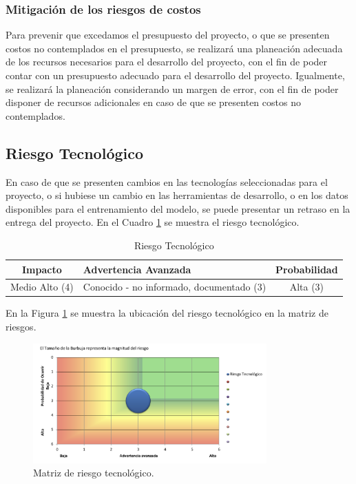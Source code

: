\subsubsection{Mitigación de los riesgos de costos}

Para prevenir que excedamos el presupuesto del proyecto, o que se presenten
costos no contemplados en el presupuesto, se realizará una planeación adecuada
de los recursos necesarios para el desarrollo del proyecto, con el fin de poder
contar con un presupuesto adecuado para el desarrollo del proyecto. Igualmente,
se realizará la planeación considerando un margen de error, con el fin de poder
disponer de recursos adicionales en caso de que se presenten costos no contemplados.

\subsection{Riesgo Tecnológico}

En caso de que se presenten cambios en las tecnologías seleccionadas para el
proyecto, o si hubiese un cambio en las herramientas de desarrollo, o en los
datos disponibles para el entrenamiento del modelo, se puede presentar un
retraso en la entrega del proyecto. En el Cuadro \ref{table:riesgo_tecnologico}
se muestra el riesgo tecnológico.

\begin{table}[H]
\centering
\begin{tabular}{|c|p{5cm}|c|}
\hline
\rowcolor{azulclaro}
  \centering\textbf{Impacto} & \centering\textbf{Advertencia Avanzada} & \centering\textbf{Probabilidad}\arraybackslash \\
\hline
  Medio Alto (4) & Conocido - no informado, documentado (3) & Alta (3) \\
\hline
\end{tabular}
\caption{Riesgo Tecnológico}
\label{table:riesgo_tecnologico}
\end{table}

En la Figura \ref{fig:riesgo_tecnologico} se muestra la ubicación del riesgo
tecnológico en la matriz de riesgos.

\begin{figure}[H]
  \centering
  \includegraphics[width=0.8\textwidth]{imagenes/03-analisis/analisis-riesgos/riesgo-tecnologico.png}
  \caption{Matriz de riesgo tecnológico.}
  \label{fig:riesgo_tecnologico}
\end{figure}

